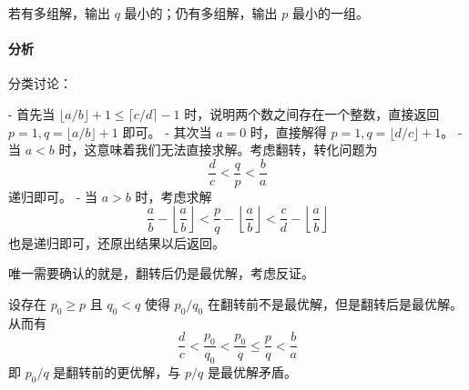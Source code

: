 若有多组解，输出 $q$ 最小的；仍有多组解，输出 $p$ 最小的一组。

\paragraph{分析}

分类讨论：

- 首先当 $\lfloor a/b \rfloor + 1 \leqslant \lceil c/d \rceil - 1$ 时，说明两个数之间存在一个整数，直接返回 $p = 1, q = \lfloor a / b \rfloor + 1$ 即可。
- 其次当 $a = 0$ 时，直接解得 $p = 1, q = \lfloor d / c \rfloor + 1$。
- 当 $a < b$ 时，这意味着我们无法直接求解。考虑翻转，转化问题为
\[ \frac{d}{c} < \frac{q}{p} < \frac{b}{a} \]
递归即可。
- 当 $a > b$ 时，考虑求解
\[ \frac{a}{b} - \left\lfloor\frac{a}{b}\right\rfloor < \frac{p}{q} - \left\lfloor\frac{a}{b}\right\rfloor < \frac{c}{d} - \left\lfloor\frac{a}{b}\right\rfloor \]
也是递归即可，还原出结果以后返回。

唯一需要确认的就是，翻转后仍是最优解，考虑反证。

设存在 $p_0 \geqslant p$ 且 $q_0 < q$ 使得 $p_0/q_0$ 在翻转前不是最优解，但是翻转后是最优解。从而有
\[ \frac{d}{c} < \frac{p_0}{q_0} < \frac{p_0}{q} \leqslant \frac{p}{q} < \frac{b}{a} \]
即 $p_0/q$ 是翻转前的更优解，与 $p/q$ 是最优解矛盾。

